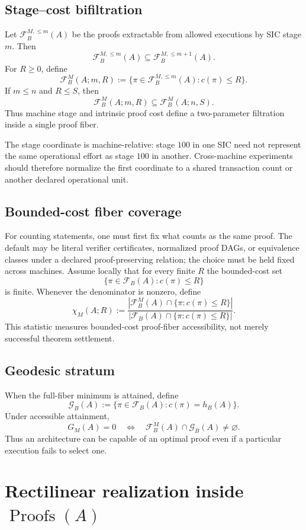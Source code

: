 \documentclass[11pt]{article}
\theoremstyle{definition}
\newcommand{\Proofs}{\operatorname{Proofs}}
\newcommand{\Fib}{\mathcal F}
\begin{document}
\subsection*{Stage--cost bifiltration}
Let $\Fib_B^{M,\le m}(A)$ be the proofs extractable from allowed executions by SIC stage $m$.  Then
\[
\Fib_B^{M,\le m}(A)\subseteq\Fib_B^{M,\le m+1}(A).
\]
For $R\ge0$, define
\[
\boxed{
\Fib_B^M(A;m,R):=
\{\pi\in\Fib_B^{M,\le m}(A):c(\pi)\le R\}.
}
\]
If $m\le n$ and $R\le S$, then
\[
\Fib_B^M(A;m,R)\subseteq\Fib_B^M(A;n,S).
\]
Thus machine stage and intrinsic proof cost define a two-parameter filtration inside a single proof fiber.

The stage coordinate is machine-relative: stage $100$ in one SIC need not represent the same operational effort as stage $100$ in another.  Cross-machine experiments should therefore normalize the first coordinate to a shared transaction count or another declared operational unit.

\subsection*{Bounded-cost fiber coverage}
For counting statements, one must first fix what counts as the same proof.  The default may be literal verifier certificates, normalized proof DAGs, or equivalence classes under a declared proof-preserving relation; the choice must be held fixed across machines.  Assume locally that for every finite $R$ the bounded-cost set
\[
\{\pi\in\Fib_B(A):c(\pi)\le R\}
\]
is finite.  Whenever the denominator is nonzero, define
\[
\boxed{
\chi_M(A;R):=
\frac{|\Fib_B^M(A)\cap\{\pi:c(\pi)\le R\}|}
{|\Fib_B(A)\cap\{\pi:c(\pi)\le R\}|}.
}
\]
This statistic measures bounded-cost proof-fiber accessibility, not merely successful theorem settlement.

\subsection*{Geodesic stratum}
When the full-fiber minimum is attained, define
\[
\mathcal G_B(A):=\{\pi\in\Fib_B(A):c(\pi)=h_B(A)\}.
\]
Under accessible attainment,
\[
G_M(A)=0
\quad\Longleftrightarrow\quad
\Fib_B^M(A)\cap\mathcal G_B(A)\ne\varnothing.
\]
Thus an architecture can be capable of an optimal proof even if a particular execution fails to select one.

\section{Rectilinear realization inside $\Proofs(A)$}
\end{document}

